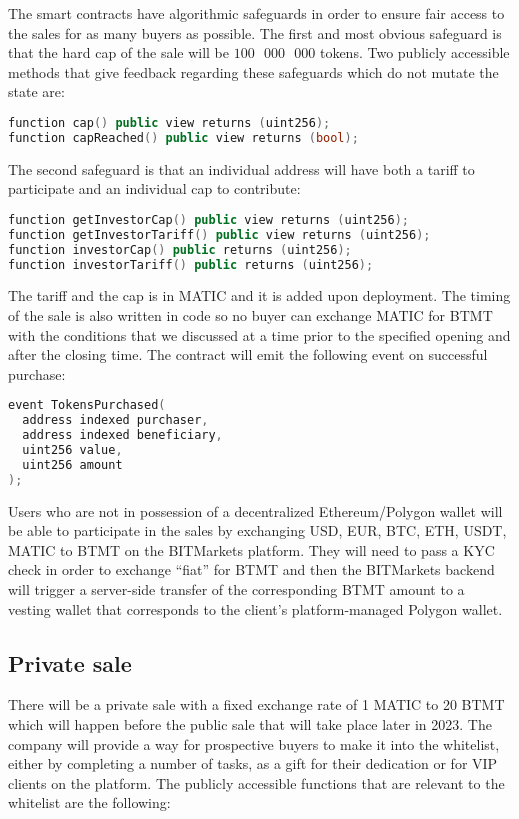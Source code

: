 \documentclass[a4paper,12pt]{article}
\begin{document}
The smart contracts have algorithmic safeguards in order to ensure fair access to
the sales for as many buyers as possible.
The first and most obvious safeguard is that the hard cap of the sale will be
$100\text{ }000\text{ }000$ tokens. Two publicly accessible methods that give feedback regarding these safeguards which do not mutate the state are:
\begin{lstlisting}[language=C++, caption=Solidity sales cap function signatures.]
function cap() public view returns (uint256);
function capReached() public view returns (bool);
\end{lstlisting}
The second safeguard is that an individual address will have
both a tariff to participate and an individual cap to contribute:
\begin{lstlisting}[language=C++, caption=Solidity sales tariff/cap function signatures.]
function getInvestorCap() public view returns (uint256);
function getInvestorTariff() public view returns (uint256);
function investorCap() public returns (uint256);
function investorTariff() public returns (uint256);
\end{lstlisting}
The tariff and the cap is in MATIC and it is added upon deployment.
The timing of the sale is also written in code so no buyer can exchange MATIC for BTMT
with the conditions that we discussed at a time prior to the specified opening and after the closing time.
The contract will emit the following event on successful purchase:
\begin{lstlisting}[language=C++, caption=BTMT private sale events.]
event TokensPurchased(
  address indexed purchaser,
  address indexed beneficiary,
  uint256 value,
  uint256 amount
);
\end{lstlisting}

Users who are not in possession of a decentralized Ethereum/Polygon wallet will be able to
participate in the sales by exchanging USD, EUR, BTC, ETH, USDT, MATIC to BTMT
on the BITMarkets platform. They will need to pass a KYC check in order to exchange
``fiat'' for BTMT and then the BITMarkets backend
will trigger a server-side transfer of the corresponding BTMT amount to a vesting wallet that corresponds to the client's platform-managed Polygon wallet.

\subsection{Private sale}

There will be a private sale with a fixed exchange rate of 1 MATIC to 20 BTMT which will happen before the public sale that will take place later in 2023.
The company will provide a way for prospective buyers to make it into the whitelist, either by completing a number of tasks, as a gift for their dedication or for VIP clients on the platform.
The publicly accessible functions that are relevant to the whitelist are the following:
\end{document}
